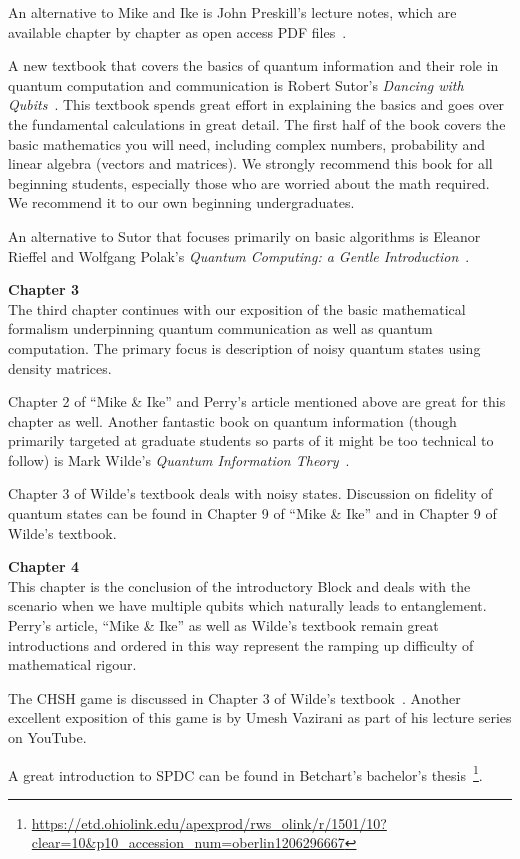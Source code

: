 An alternative to Mike and Ike is John Preskill's lecture notes, which are available chapter by chapter as open access PDF files~\cite{preskill:PH-CS219}.

A new textbook that covers the basics of quantum information and their role in quantum computation and communication is Robert Sutor's \emph{Dancing with Qubits}~\cite{sutor19:dancing}. This textbook spends great effort in explaining the basics and goes over the fundamental calculations in great detail. The first half of the book covers the basic mathematics you will need, including complex numbers, probability and linear algebra (vectors and matrices). We strongly recommend this book for all beginning students, especially those who are worried about the math required. We recommend it to our own beginning undergraduates.

An alternative to Sutor that focuses primarily on basic algorithms is Eleanor Rieffel and Wolfgang Polak's \emph{Quantum Computing: a Gentle Introduction}~\cite{rieffel2011quantum}.

{\bf Chapter 3}\\

The third chapter continues with our exposition of the basic mathematical formalism underpinning quantum communication as well as quantum computation. The primary focus is description of noisy quantum states using density matrices.

Chapter 2 of “Mike \& Ike” and Perry’s article mentioned above are great for this chapter as well. Another fantastic book on quantum information (though primarily targeted at graduate students so parts of it might be too technical to follow) is Mark Wilde's \emph{Quantum Information Theory}~\cite{wilde2013quantum}.

Chapter 3 of Wilde’s textbook deals with noisy states. Discussion on fidelity of quantum states can be found in Chapter 9 of “Mike \& Ike” and in Chapter 9 of Wilde’s textbook.

{\bf Chapter 4}\\

This chapter is the conclusion of the introductory Block and deals with the scenario when we have multiple qubits which naturally leads to entanglement. Perry’s article, “Mike \& Ike” as well as Wilde’s textbook remain great introductions and ordered in this way represent the ramping up difficulty of mathematical rigour. 

The CHSH game is discussed in Chapter 3 of Wilde’s textbook~\cite{wilde2013quantum}. Another excellent exposition of this game is by Umesh Vazirani as part of his lecture series on YouTube.

A great introduction to SPDC can be found in Betchart’s bachelor's thesis~\footnote{\url{https://etd.ohiolink.edu/apexprod/rws_olink/r/1501/10?clear=10&p10_accession_num=oberlin1206296667}}.

